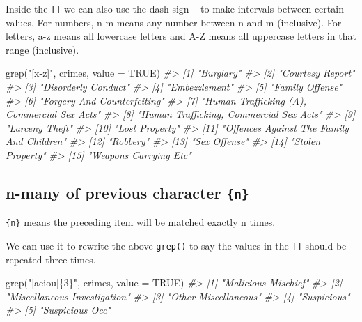 \documentclass[
]{krantz}
\makeatletter
\newenvironment{Shaded}{\begin{snugshade}}{\end{snugshade}}
\newcommand{\AttributeTok}[1]{\textcolor[rgb]{0.61,0.61,0.61}{#1}}
\newcommand{\CommentTok}[1]{\textcolor[rgb]{0.37,0.37,0.37}{\textit{#1}}}
\newcommand{\ConstantTok}[1]{\textcolor[rgb]{0,0,0}{#1}}
\newcommand{\FunctionTok}[1]{\textcolor[rgb]{0,0,0}{#1}}
\newcommand{\NormalTok}[1]{#1}
\newcommand{\StringTok}[1]{\textcolor[rgb]{0.5,0.5,0.5}{#1}}
\newenvironment{kframe}{%
\medskip{}
\setlength{\fboxsep}{.8em}
 \def\at@end@of@kframe{}%
 \ifinner\ifhmode%
  \def\at@end@of@kframe{\end{minipage}}%
  \begin{minipage}{\columnwidth}%
 \fi\fi%
 \def\FrameCommand##1{\hskip\@totalleftmargin \hskip-\fboxsep
 \colorbox{shadecolor}{##1}\hskip-\fboxsep
     \hskip-\linewidth \hskip-\@totalleftmargin \hskip\columnwidth}%
 \MakeFramed {\advance\hsize-\width
   \@totalleftmargin\z@ \linewidth\hsize
   \@setminipage}}%
 {\par\unskip\endMakeFramed%
 \at@end@of@kframe}
\renewenvironment{Shaded}{\begin{kframe}}{\end{kframe}}
\makeatother
\begin{document}
Inside the \texttt{{[}{]}} we can also use the dash sign
\texttt{-} to make intervals between certain values. For
numbers, n-m means any number between n and m (inclusive).
For letters, a-z means all lowercase letters and A-Z means
all uppercase letters in that range (inclusive).

\begin{Shaded}
\begin{Highlighting}[]
\FunctionTok{grep}\NormalTok{(}\StringTok{"[x{-}z]"}\NormalTok{, crimes, }\AttributeTok{value =} \ConstantTok{TRUE}\NormalTok{)}
\CommentTok{\#\textgreater{}  [1] "Burglary"                                  }
\CommentTok{\#\textgreater{}  [2] "Courtesy Report"                           }
\CommentTok{\#\textgreater{}  [3] "Disorderly Conduct"                        }
\CommentTok{\#\textgreater{}  [4] "Embezzlement"                              }
\CommentTok{\#\textgreater{}  [5] "Family Offense"                            }
\CommentTok{\#\textgreater{}  [6] "Forgery And Counterfeiting"                }
\CommentTok{\#\textgreater{}  [7] "Human Trafficking (A), Commercial Sex Acts"}
\CommentTok{\#\textgreater{}  [8] "Human Trafficking, Commercial Sex Acts"    }
\CommentTok{\#\textgreater{}  [9] "Larceny Theft"                             }
\CommentTok{\#\textgreater{} [10] "Lost Property"                             }
\CommentTok{\#\textgreater{} [11] "Offences Against The Family And Children"  }
\CommentTok{\#\textgreater{} [12] "Robbery"                                   }
\CommentTok{\#\textgreater{} [13] "Sex Offense"                               }
\CommentTok{\#\textgreater{} [14] "Stolen Property"                           }
\CommentTok{\#\textgreater{} [15] "Weapons Carrying Etc"}
\end{Highlighting}
\end{Shaded}

\hypertarget{n-many-of-previous-character-n}{%
\subsection{\texorpdfstring{n-many of previous character
\texttt{\{n\}}}{n-many of previous character \{n\}}}\label{n-many-of-previous-character-n}}

\texttt{\{n\}} means the preceding item will be matched
exactly n times.

We can use it to rewrite the above \texttt{grep()} to say
the values in the \texttt{{[}{]}} should be repeated three
times.

\begin{Shaded}
\begin{Highlighting}[]
\FunctionTok{grep}\NormalTok{(}\StringTok{"[aeiou]\{3\}"}\NormalTok{, crimes, }\AttributeTok{value =} \ConstantTok{TRUE}\NormalTok{)}
\CommentTok{\#\textgreater{} [1] "Malicious Mischief"         }
\CommentTok{\#\textgreater{} [2] "Miscellaneous Investigation"}
\CommentTok{\#\textgreater{} [3] "Other Miscellaneous"        }
\CommentTok{\#\textgreater{} [4] "Suspicious"                 }
\CommentTok{\#\textgreater{} [5] "Suspicious Occ"}
\end{Highlighting}
\end{Shaded}
\end{document}
